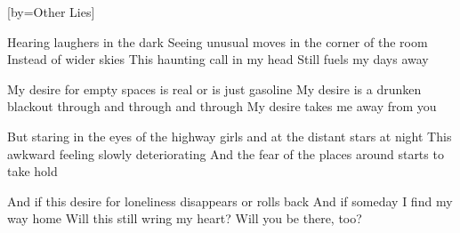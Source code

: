 [by={Other Lies}]

  \chordsoff
  \beginverse
  Hearing laughers in the dark 
  Seeing unusual moves in the corner of the room
  Instead of wider skies
  This haunting call in my head 
  Still fuels my days away
  \endverse

  \beginverse
  My desire for empty spaces is real or is just gasoline
  My desire is a drunken blackout through and through and through 
  My desire takes me away from you
  \endverse

  \beginverse  
  But staring in the eyes of the highway girls and at the distant stars at night
  This awkward feeling slowly deteriorating
  And the fear of the places around starts to take hold
  \endverse

  \beginverse  
  And if this desire for loneliness disappears or rolls back
  And if someday I find my way home
  Will this still wring my heart? 
  Will you be there, too?  
  \endverse
\endsong
